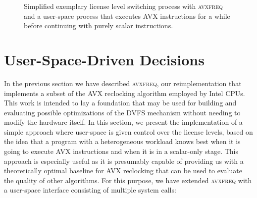 \begin{figure*}
	\caption{Simplified exemplary license level switching process with \textsc{avxfreq} and a user-space process that executes \gls{AVX} instructions for a while before continuing with purely scalar instructions.}
	\label{fig:design:reimplementation:avxfreq}
\end{figure*}

\section{User-Space-Driven Decisions}
\label{sec:design:userspacedrivendecisions}

In the previous section we have described \textsc{avxfreq}, our reimplementation that implements a subset of the \gls{AVX} reclocking algorithm employed by Intel \glspl{CPU}. This work is intended to lay a foundation that may be used for building and evaluating possible optimizations of the \gls{DVFS} mechanism without needing to modify the hardware itself. In this section, we present the implementation of a simple approach where user-space is given control over the license levels, based on the idea that a program with a heterogeneous workload knows best when it is going to execute \gls{AVX} instructions and when it is in a scalar-only stage. This approach is especially useful as it is presumably capable of providing us with a theoretically optimal baseline for \gls{AVX} reclocking that can be used to evaluate the quality of other algorithms. For this purpose, we have extended \textsc{avxfreq} with a user-space interface consisting of multiple system calls:

